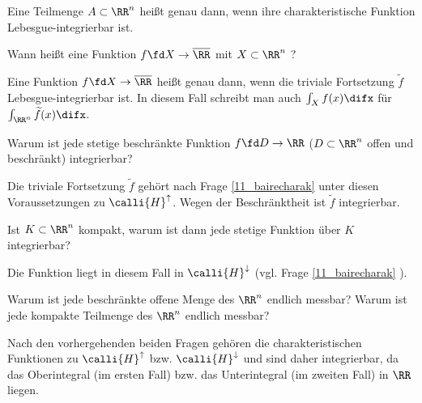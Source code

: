 \begin{antwort}
  Eine Teilmenge $A\subset\RR^n$ heißt  genau 
  dann, wenn ihre charakteristische Funktion Lebesgue-integrierbar ist.
  \AntEnd
\end{antwort}

\begin{frage}
  Wann hei{\ss}t eine Funktion $f\fd X\to\overline{\RR}$ 
  mit $X\subset\RR^n$ ?
\end{frage}

\begin{antwort}
  Eine Funktion $f\fd X\to\overline{\RR}$ heißt 
   genau dann, wenn die triviale Fortsetzung 
  $\widetilde{f}$ Lebesgue-integrierbar ist. 
  In diesem Fall schreibt man auch $\int_X f(x) \difx$ für 
  $\int_{\RR^n} \widetilde{f}(x) \difx$. \AntEnd
\end{antwort}

\begin{frage}
  Warum ist jede stetige beschr\"ankte Funktion $f\fd D \to\RR$ 
  ($D\subset\RR^n$ offen und beschr\"ankt) integrierbar?
\end{frage}

\begin{antwort}
  Die triviale Fortsetzung $\tilde{f}$ gehört nach Frage 
  \ref{11_bairecharak}  
  unter diesen Voraussetzungen zu $\calli{H}^\uparrow$. 
  Wegen der Beschränktheit ist $\widetilde{f}$ integrierbar.  
  \AntEnd 
\end{antwort} 

\begin{frage}
  Ist $K\subset\RR^n$ kompakt, warum ist dann jede stetige Funktion 
  \"uber $K$ integrierbar?
\end{frage}
\begin{antwort}
  
  Die Funktion liegt in diesem Fall in 
  $\calli{H}^\downarrow $ (vgl. Frage 
  \ref{11_bairecharak} ). 
  \AntEnd 
\end{antwort} 

\begin{frage}
  Warum ist jede beschr\"ankte offene Menge des $\RR^n$ endlich messbar?
  Warum ist jede kompakte Teilmenge des $\RR^n$ endlich messbar?
\end{frage}

\begin{antwort}
  Nach den vorhergehenden beiden Fragen gehören die charakteristischen 
  Funktionen zu $\calli{H}^\uparrow$ bzw. $\calli{H}^\downarrow$ und sind 
  daher integrierbar, da das Oberintegral (im ersten 
  Fall) bzw. das Unterintegral (im zweiten Fall) in $\RR$ liegen. 
  \AntEnd
\end{antwort} 

